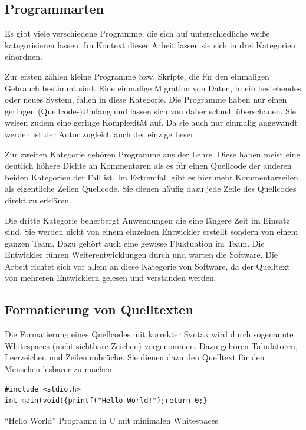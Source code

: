\subsection{Programmarten}

Es gibt viele verschiedene Programme, die sich auf unterschiedliche weiße kategorisieren lassen. Im Kontext dieser Arbeit lassen sie sich in drei Kategorien einordnen.

Zur ersten zählen kleine Programme bzw. Skripte, die für den einmaligen
Gebrauch bestimmt sind. Eine einmalige Migration von Daten, in ein bestehendes
oder neues System, fallen in diese Kategorie. Die Programme haben nur einen
geringen (Quellcode-)Umfang und lassen sich von daher schnell überschauen. Sie weisen zudem eine geringe Komplexität auf. Da sie auch nur einmalig angewandt werden ist der Autor zugleich auch der einzige Leser.

Zur zweiten Kategorie gehören Programme aus der Lehre. Diese haben meist eine
deutlich höhere Dichte an Kommentaren als es für einen Quellcode der anderen
beiden Kategorien der Fall ist. Im Extremfall gibt es hier mehr Kommentarzeilen als eigentliche Zeilen Quellcode.  Sie dienen häufig dazu jede Zeile des Quellcodes direkt zu erklären.

Die dritte Kategorie beherbergt Anwendungen die eine längere Zeit im Einsatz sind.
Sie werden nicht von einem einzelnen Entwickler erstellt sondern von einem ganzen Team. Dazu gehört auch eine gewisse Fluktuation im Team. Die Entwickler führen Weiterentwicklungen durch und warten die Software. Die Arbeit richtet sich vor allem an diese Kategorie von Software, da der Quelltext von mehreren Entwicklern gelesen und 
verstanden werden.

\subsection{Formatierung von Quelltexten}


Die Formatierung eines Quellcodes mit korrekter Syntax wird durch
sogenannte Whitespaces (nicht sichtbare Zeichen) vorgenommen.
Dazu gehören Tabulatoren, Leerzeichen und Zeilenumbrüche. Sie dienen dazu den Quelltext für den Menschen lesbarer zu machen.

\begin{listing}[H]
    \begin{verbatim}
#include <stdio.h>
int main(void){printf("Hello World!");return 0;}
    \end{verbatim}
    \caption{\enquote{Hello World} Programm in C mit minimalen Whitespaces}
    \label{grundlagen:hellocminimal}
\end{listing}

